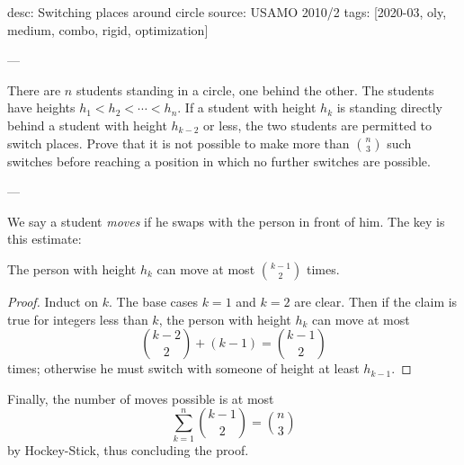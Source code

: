 desc: Switching places around circle
source: USAMO 2010/2
tags: [2020-03, oly, medium, combo, rigid, optimization]

---

There are $n$ students standing in a circle, one behind the other. The students have heights $h_1<h_2<\cdots<h_n$. If a student with height $h_k$ is standing directly behind a student with height $h_{k-2}$ or less, the two students are permitted to switch places. Prove that it is not possible to make more than $\binom n3$ such switches before reaching a position in which no further switches are possible.

---

We say a student \emph{moves} if he swaps with the person in front of him. The key is this estimate:
\begin{claim*}
    The person with height $h_k$ can move at most $\binom{k-1}2$ times.
\end{claim*}
\begin{proof}
    Induct on $k$. The base cases $k=1$ and $k=2$ are clear. Then if the claim is true for integers less than $k$, the person with height $h_k$ can move at most \[\binom{k-2}2+(k-1)=\binom{k-1}2\]
    times; otherwise he must switch with someone of height at least $h_{k-1}$.
\end{proof}

Finally, the number of moves possible is at most \[\sum_{k=1}^n\binom{k-1}2=\binom n3\]
by Hockey-Stick, thus concluding the proof.
